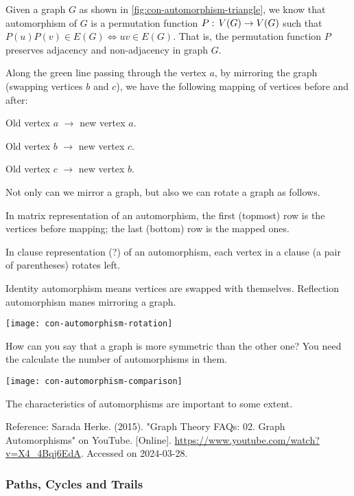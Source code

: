 \documentclass[../src/handouts/main.tex]{subfiles}
\begin{document}
Given a graph $G$ as shown in \cref{fig:con-automorphism-triangle}, we know that automorphism of $G$ is a permutation function $P:\, V(G) \to V(G)$ such that $P(u)P(v) \in E(G) \iff uv \in E(G)$. That is, the permutation function $P$ preserves adjacency and non-adjacency in graph $G$.

Along the green line passing through the vertex $a$, by mirroring the graph (swapping vertices $b$ and $c$), we have the following mapping of vertices before and after:
\begin{enumerate*}
  \def\mapping#1#2{Old vertex $#1$ $\rightarrow$ new vertex $#2$.}%
  \item \mapping{a}{a}
  \item \mapping{b}{c}
  \item \mapping{c}{b}
\end{enumerate*}

Not only can we mirror a graph, but also we can rotate a graph as follows.

In matrix representation of an automorphism, the first (topmost) row is the vertices before mapping; the last (bottom) row is the mapped ones.

In clause representation (?) of an automorphism, each vertex in a clause (a pair of parentheses) rotates left.

Identity automorphism means vertices are swapped with themselves. Reflection automorphism manes mirroring a graph.

\begin{center}
  \texttt{[image: con-automorphism-rotation]}
\end{center}

How can you say that a graph is more symmetric than the other one? You need the calculate the number of automorphisms in them.

\begin{center}
  \texttt{[image: con-automorphism-comparison]}
\end{center}
The characteristics of automorphisms are important to some extent.

Reference: Sarada Herke. (2015). "Graph Theory FAQs: 02. Graph Automorphisms" on YouTube. [Online]. \url{https://www.youtube.com/watch?v=X4_4Bqj6EdA}. Accessed on 2024-03-28.

\subsubsection{Paths, Cycles and Trails}
\end{document}
